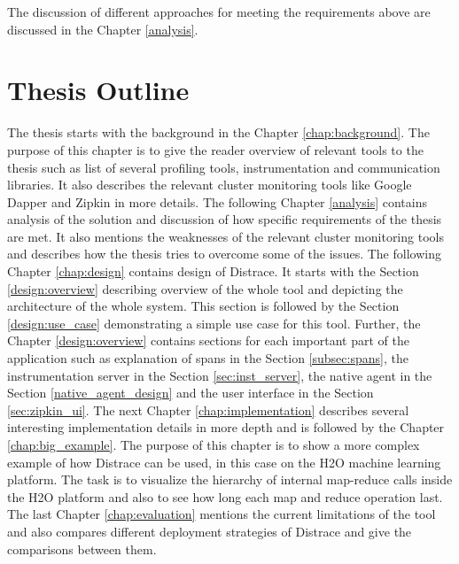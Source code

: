 The discussion of different approaches for meeting the requirements above are discussed in the Chapter \ref{analysis}.

\section{Thesis Outline}
The thesis starts with the background in the Chapter \ref{chap:background}. The purpose of this chapter is to give the reader overview of relevant tools to the thesis such as list of several profiling tools, instrumentation and communication libraries. It also describes the relevant cluster monitoring tools like Google Dapper and Zipkin in more details. The following Chapter \ref{analysis} contains analysis of the solution and discussion of how specific requirements of the thesis are met. It also mentions the weaknesses of the relevant cluster monitoring tools and describes how the thesis tries to overcome some of the issues. The following Chapter \ref{chap:design} contains design of Distrace. It starts with the Section \ref{design:overview} describing overview of the whole tool and depicting the architecture of the whole system. This section is followed by the Section \ref{design:use_case} demonstrating a simple use case for this tool. Further, the Chapter \ref{design:overview} contains sections for each important part of the application such as explanation of spans in the Section \ref{subsec:spans}, the instrumentation server in the Section \ref{sec:inst_server}, the native agent in the Section \ref{native_agent_design} and the user interface in the Section \ref{sec:zipkin_ui}. The next Chapter \ref{chap:implementation} describes several interesting implementation details in more depth and is followed by the Chapter \ref{chap:big_example}. The purpose of this chapter is to show a more complex example of how Distrace can be used, in this case on the H2O machine learning platform. The task is to visualize the hierarchy of internal map-reduce calls inside the H2O platform and also to see how long each map and reduce operation last. The last Chapter \ref{chap:evaluation} mentions the current limitations of the tool and also compares different deployment strategies of Distrace and give the comparisons between them.
